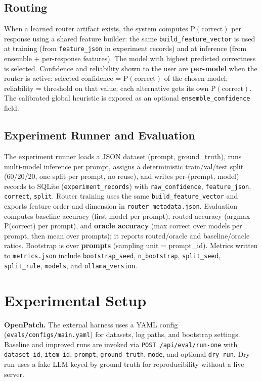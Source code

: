 \documentclass[11pt]{article}
\begin{document}
\subsection{Routing}
When a learned router artifact exists, the system computes $\mathrm{P}(\mathrm{correct})$ per response using a shared feature builder: the same \texttt{build\_feature\_vector} is used at training (from \texttt{feature\_json} in experiment records) and at inference (from ensemble + per-response features). The model with highest predicted correctness is selected. Confidence and reliability shown to the user are \textbf{per-model} when the router is active: selected confidence = $\mathrm{P}(\mathrm{correct})$ of the chosen model; reliability = threshold on that value; each alternative gets its own $\mathrm{P}(\mathrm{correct})$. The calibrated global heuristic is exposed as an optional \texttt{ensemble\_confidence} field.

\subsection{Experiment Runner and Evaluation}
The experiment runner loads a JSON dataset (prompt, ground\_truth), runs multi-model inference per prompt, assigns a deterministic train/val/test split (60/20/20, one split per prompt, no reuse), and writes per-(prompt, model) records to SQLite (\texttt{experiment\_records}) with \texttt{raw\_confidence}, \texttt{feature\_json}, \texttt{correct}, \texttt{split}. Router training uses the same \texttt{build\_feature\_vector} and exports feature order and dimension in \texttt{router\_metadata.json}. Evaluation computes baseline accuracy (first model per prompt), routed accuracy (argmax P(correct) per prompt), and \textbf{oracle accuracy} (max correct over models per prompt, then mean over prompts); it reports routed/oracle and baseline/oracle ratios. Bootstrap is over \textbf{prompts} (sampling unit = prompt\_id). Metrics written to \texttt{metrics.json} include \texttt{bootstrap\_seed}, \texttt{n\_bootstrap}, \texttt{split\_seed}, \texttt{split\_rule}, \texttt{models}, and \texttt{ollama\_version}.

\section{Experimental Setup}
\label{sec:setup}

\textbf{OpenPatch.} The external harness uses a YAML config (\texttt{evals/configs/main.yaml}) for datasets, log paths, and bootstrap settings. Baseline and improved runs are invoked via \texttt{POST /api/eval/run-one} with \texttt{dataset\_id}, \texttt{item\_id}, \texttt{prompt}, \texttt{ground\_truth}, \texttt{mode}, and optional \texttt{dry\_run}. Dry-run uses a fake LLM keyed by ground truth for reproducibility without a live server.
\end{document}
